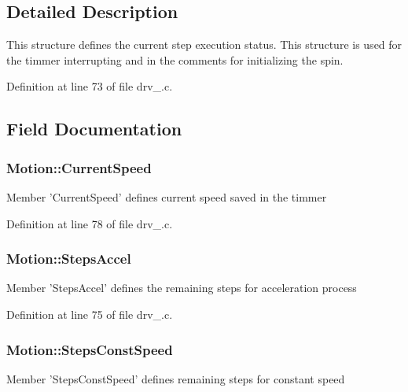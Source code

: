 \subsection{Detailed Description}
This structure defines the current step execution status. This structure is used for the timmer interrupting and in the comments for initializing the spin. 

Definition at line 73 of file drv\-\_.\-c.



\subsection{Field Documentation}
\hypertarget{structMotion_a50860ebd661de5d104a36a92cd5f17c7}{
\subsubsection[{Current\-Speed}]{\setlength{\rightskip}{0pt plus 5cm}Motion\-::\-Current\-Speed}}\label{structMotion_a50860ebd661de5d104a36a92cd5f17c7}
Member 'Current\-Speed' defines current speed saved in the timmer 

Definition at line 78 of file drv\-\_.\-c.

\hypertarget{structMotion_a970d0810aac5cab75c8dd0c95e4473da}{
\subsubsection[{Steps\-Accel}]{\setlength{\rightskip}{0pt plus 5cm}Motion\-::\-Steps\-Accel}}\label{structMotion_a970d0810aac5cab75c8dd0c95e4473da}
Member 'Steps\-Accel' defines the remaining steps for acceleration process 

Definition at line 75 of file drv\-\_.\-c.

\hypertarget{structMotion_aa99fa8cb04ab25fc08e7b65664b7fdef}{
\subsubsection[{Steps\-Const\-Speed}]{\setlength{\rightskip}{0pt plus 5cm}Motion\-::\-Steps\-Const\-Speed}}\label{structMotion_aa99fa8cb04ab25fc08e7b65664b7fdef}
Member 'Steps\-Const\-Speed' defines remaining steps for constant speed 

